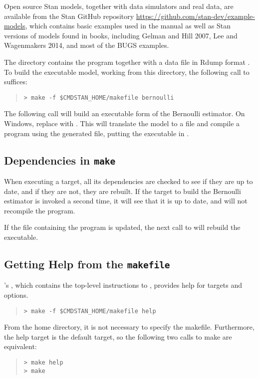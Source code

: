 Open source Stan models, together with data simulators and real data,
are available from the Stan GitHub repository 
\url{https://github.com/stan-dev/example-models},
which contains basic examples used in the manual
as well as Stan versions of models found in books, including
Gelman and Hill 2007, Lee and Wagenmakers 2014, and most of the BUGS examples.

The directory 
contains the \Stan program 
together with a data file in Rdump format .
To build the \CmdStan executable model, working from this directory,
the following call to  suffices:
%
\begin{quote}
\begin{Verbatim}[fontshape=sl]
> make -f $CMDSTAN_HOME/makefile bernoulli
\end{Verbatim}
\end{quote}
The following call will build an executable form of the Bernoulli
estimator. On Windows, replace  with .
This will translate the model  to a \Cpp file and
compile a \CmdStan program using the generated \Cpp file, putting the
executable in
.

\subsection{Dependencies in {\tt\bfseries make}}

When executing a  target, all its dependencies are checked
to see if they are up to date, and if they are not, they are rebuilt.
If the  target to build the Bernoulli estimator is invoked
a second time, it will see that it is up to date, and will not
recompile the program.

If the file containing the \Stan program is updated, the next call to
 will rebuild the \CmdStan executable.



\subsection{Getting Help from the {\tt makefile}}

\CmdStan's , which contains the top-level instructions to
, provides help for targets and options.
%
\begin{quote}
\begin{Verbatim}[fontshape=sl]
> make -f $CMDSTAN_HOME/makefile help
\end{Verbatim}
\end{quote}
From the \CmdStan home directory, it is not necessary to specify the makefile.
Furthermore, the help target is the default target, so the following two calls
to make are equivalent:
%
\begin{quote}
\begin{Verbatim}[fontshape=sl]
> make help
> make
\end{Verbatim}
\end{quote}
%




